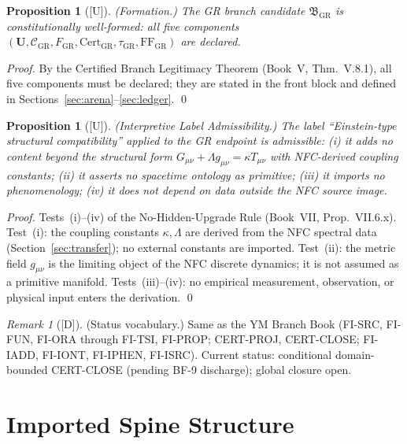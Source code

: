 \documentclass[12pt,oneside]{amsbook}
\theoremstyle{plain}
\newtheorem{proposition}[theorem]{Proposition}
\theoremstyle{definition}
\theoremstyle{remark}
\newtheorem{remark}[theorem]{Remark}
\newcommand{\status}[1]{\textup{[#1]}}
\begin{document}
\begin{proposition}[\status{U}]\label{prop:gr-formation}
\textup{(Formation.)} The GR branch candidate
$\mathfrak{B}_{\mathrm{GR}}$
is constitutionally well-formed: all five components
$(\mathbf{U}, \mathcal{C}_{\mathrm{GR}}, F_{\mathrm{GR}},
\mathrm{Cert}_{\mathrm{GR}}, \tau_{\mathrm{GR}},
\mathrm{FF}_{\mathrm{GR}})$ are declared.
\end{proposition}

\begin{proof}
By the Certified Branch Legitimacy Theorem (Book~V, Thm.~V.8.1),
all five components must be declared; they are stated in the
front block and defined in Sections~\ref{sec:arena}--\ref{sec:ledger}.
\qed
\end{proof}

\begin{proposition}[\status{U}]\label{prop:gr-label}
\textup{(Interpretive Label Admissibility.)} The label
``Einstein-type structural compatibility'' applied to the GR
endpoint is admissible: (i) it adds no content beyond the
structural form $G_{\mu\nu} + \Lambda g_{\mu\nu} = \kappa
T_{\mu\nu}$ with NFC-derived coupling constants; (ii) it asserts
no spacetime ontology as primitive; (iii) it imports no
phenomenology; (iv) it does not depend on data outside the
NFC source image.
\end{proposition}

\begin{proof}
Tests~(i)--(iv) of the No-Hidden-Upgrade Rule (Book~VII,
Prop.~VII.6.x). Test~(i): the coupling constants $\kappa,
\Lambda$ are derived from the NFC spectral data
(Section~\ref{sec:transfer}); no external constants are imported.
Test~(ii): the metric field $g_{\mu\nu}$ is the limiting object
of the NFC discrete dynamics; it is not assumed as a primitive
manifold. Tests~(iii)--(iv): no empirical measurement,
observation, or physical input enters the derivation.
\qed
\end{proof}

\begin{remark}[\status{D}]\label{rmk:gr-status-vocab}
\textup{(Status vocabulary.)} Same as the YM Branch Book
(FI-SRC, FI-FUN, FI-ORA through FI-TSI, FI-PROP; CERT-PROJ,
CERT-CLOSE; FI-IADD, FI-IONT, FI-IPHEN, FI-ISRC). Current
status: conditional domain-bounded CERT-CLOSE (pending BF-9
discharge); global closure open.
\end{remark}

\section{Imported Spine Structure}
\label{sec:imports}
\end{document}
